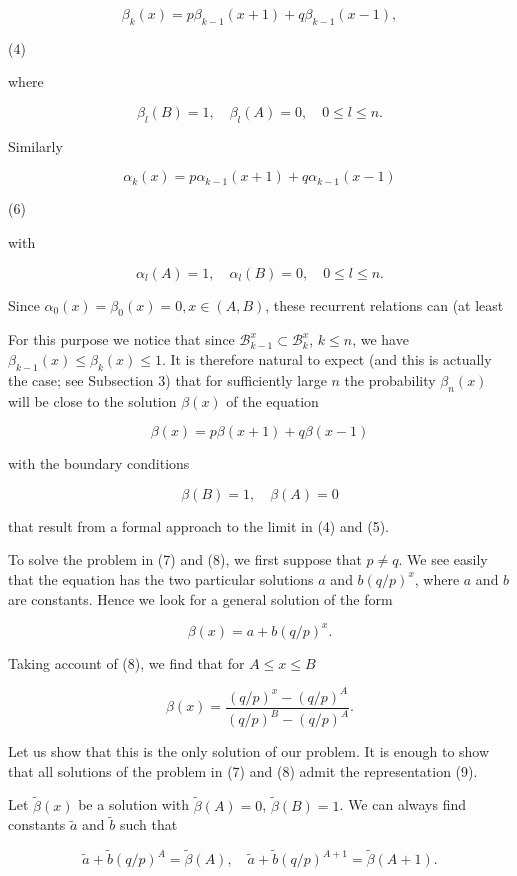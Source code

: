 $$\beta_k(x) = p\beta_{k-1}(x + 1) + q\beta_{k-1}(x - 1),$$

(4)

where

$$\beta_l(B) = 1, \quad \beta_l(A) = 0, \quad 0 \leq l \leq n.$$

Similarly

$$\alpha_k(x) = p\alpha_{k-1}(x + 1) + q\alpha_{k-1}(x - 1)$$

(6)

with

$$\alpha_l(A) = 1, \quad \alpha_l(B) = 0, \quad 0 \leq l \leq n.$$

Since $\alpha_0(x) = \beta_0(x) = 0, x \in (A, B)$, these recurrent relations can (at least

For this purpose we notice that since $\mathcal{B}_{k-1}^x \subset \mathcal{B}_k^x$, $k \leq n$, we have $\beta_{k-1}(x) \leq \beta_k(x) \leq 1$. It is therefore natural to expect (and this is actually the case; see Subsection 3) that for sufficiently large $n$ the probability $\beta_n(x)$ will be close to the solution $\beta(x)$ of the equation

$$\beta(x) = p\beta(x+1) + q\beta(x-1)$$

with the boundary conditions

$$\beta(B) = 1, \quad \beta(A) = 0$$

that result from a formal approach to the limit in (4) and (5).

To solve the problem in (7) and (8), we first suppose that $p \neq q$. We see easily that the equation has the two particular solutions $a$ and $b(q/p)^x$, where $a$ and $b$ are constants. Hence we look for a general solution of the form

$$\beta(x) = a + b(q/p)^x.$$

Taking account of (8), we find that for $A \leq x \leq B$

$$\beta(x) = \frac{(q/p)^x - (q/p)^A}{(q/p)^B - (q/p)^A}.$$

Let us show that this is the only solution of our problem. It is enough to show that all solutions of the problem in (7) and (8) admit the representation (9).

Let $\tilde{\beta}(x)$ be a solution with $\tilde{\beta}(A) = 0$, $\tilde{\beta}(B) = 1$. We can always find constants $\tilde{a}$ and $\tilde{b}$ such that

$$\tilde{a} + \tilde{b}(q/p)^A = \tilde{\beta}(A), \quad \tilde{a} + \tilde{b}(q/p)^{A+1} = \tilde{\beta}(A+1).$$

